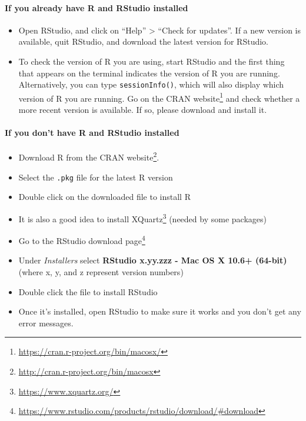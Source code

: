 \documentclass[
  12pt,
]{book}
\newcommand{\passthrough}[1]{#1}
\providecommand{\tightlist}{%
  \setlength{\itemsep}{0pt}\setlength{\parskip}{0pt}}
\renewcommand{\href}[2]{#2\footnote{\url{#1}}}
\theoremstyle{definition}
\theoremstyle{definition}
\theoremstyle{definition}
\newcommand{\1}{\mathbbm{1}}
\begin{document}
\hypertarget{if-you-already-have-r-and-rstudio-installed-1}{%
\paragraph{If you already have R and RStudio installed}\label{if-you-already-have-r-and-rstudio-installed-1}}

\begin{itemize}
\tightlist
\item
  Open RStudio, and click on ``Help'' \textgreater{} ``Check for updates''. If a new version is
  available, quit RStudio, and download the latest version for RStudio.
\item
  To check the version of R you are using, start RStudio and the first thing
  that appears on the terminal indicates the version of R you are running.
  Alternatively, you can type \passthrough{\lstinline!sessionInfo()!}, which will also display which
  version of R you are running. Go on the \href{https://cran.r-project.org/bin/macosx/}{CRAN
  website} and check whether a more
  recent version is available. If so, please download and install it.
\end{itemize}

\hypertarget{if-you-dont-have-r-and-rstudio-installed-1}{%
\paragraph{If you don't have R and RStudio installed}\label{if-you-dont-have-r-and-rstudio-installed-1}}

\begin{itemize}
\tightlist
\item
  Download R from the \href{http://cran.r-project.org/bin/macosx}{CRAN website}.
\item
  Select the \passthrough{\lstinline!.pkg!} file for the latest R version
\item
  Double click on the downloaded file to install R
\item
  It is also a good idea to install \href{https://www.xquartz.org/}{XQuartz} (needed
  by some packages)
\item
  Go to the \href{https://www.rstudio.com/products/rstudio/download/\#download}{RStudio download
  page}
\item
  Under \emph{Installers} select \textbf{RStudio x.yy.zzz - Mac OS X 10.6+ (64-bit)}
  (where x, y, and z represent version numbers)
\item
  Double click the file to install RStudio
\item
  Once it's installed, open RStudio to make sure it works and you don't get any
  error messages.
\end{itemize}
\end{document}
